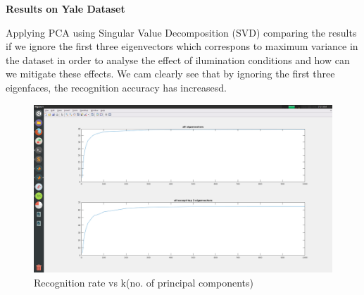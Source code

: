 \documentclass{article}
\begin{document}
\newpage

\textbf{Results on Yale Dataset}
\vskip 0.5in

Applying PCA using Singular Value Decomposition (SVD)  comparing the results if we ignore the first three eigenvectors which correspons to maximum variance in the dataset in order to analyse the effect of ilumination conditions and how can we mitigate these effects. 
We cam clearly see that by ignoring the first three eigenfaces, the recognition accuracy has increasesd.  
\begin{figure}[h!]
  \includegraphics[width=\linewidth]{Q1_yale.png}
  \caption{Recognition rate vs k(no. of principal components)}
  \label{fig:result2}
\end{figure}
\end{document}
